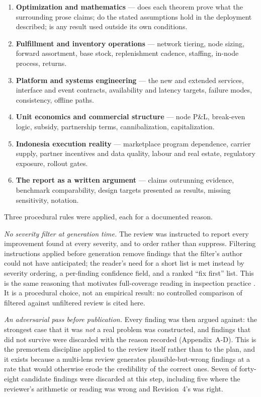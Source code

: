 \begin{enumerate}
\item \textbf{Optimization and mathematics} --- does each theorem prove what the surrounding prose claims; do the stated assumptions hold in the deployment described; is any result used outside its own conditions.
\item \textbf{Fulfillment and inventory operations} --- network tiering, node sizing, forward assortment, base stock, replenishment cadence, staffing, in-node process, returns.
\item \textbf{Platform and systems engineering} --- the new and extended services, interface and event contracts, availability and latency targets, failure modes, consistency, offline paths.
\item \textbf{Unit economics and commercial structure} --- node P\&L, break-even logic, subsidy, partnership terms, cannibalization, capitalization.
\item \textbf{Indonesia execution reality} --- marketplace program dependence, carrier supply, partner incentives and data quality, labour and real estate, regulatory exposure, rollout gates.
\item \textbf{The report as a written argument} --- claims outrunning evidence, benchmark comparability, design targets presented as results, missing sensitivity, notation.
\end{enumerate}

Three procedural rules were applied, each for a documented reason.

\emph{No severity filter at generation time.} The review was instructed to report every improvement found at every severity, and to order rather than suppress. Filtering instructions applied before generation remove findings that the filter's author could not have anticipated; the reader's need for a short list is met instead by severity ordering, a per-finding confidence field, and a ranked ``fix first'' list. This is the same reasoning that motivates full-coverage reading in inspection practice \cite{fagan1976,porter1995}. It is a procedural choice, not an empirical result: no controlled comparison of filtered against unfiltered review is cited here.

\emph{An adversarial pass before publication.} Every finding was then argued against: the strongest case that it was \emph{not} a real problem was constructed, and findings that did not survive were discarded with the reason recorded (Appendix~A-D). This is the premortem discipline \cite{klein2007} applied to the review itself rather than to the plan, and it exists because a multi-lens review generates plausible-but-wrong findings at a rate that would otherwise erode the credibility of the correct ones. Seven of forty-eight candidate findings were discarded at this step, including five where the reviewer's arithmetic or reading was wrong and Revision~4's was right.

